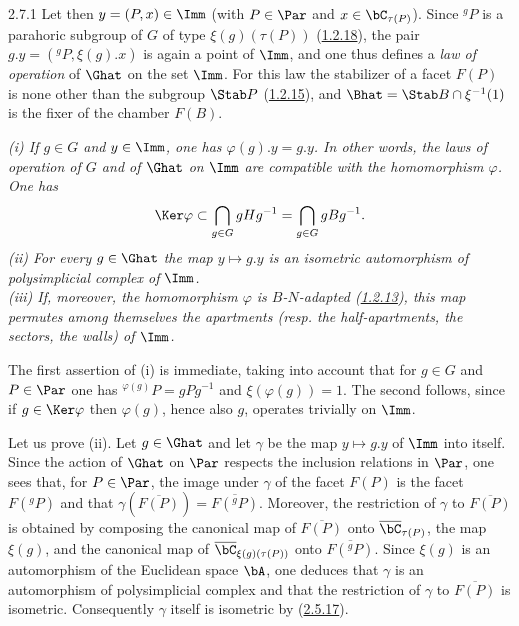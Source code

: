 \documentclass[12pt,a4paper,oneside,english]{smfart}
\makeatletter
\newcommand{\btanchor}[1]{\leavevmode\Hy@raisedlink{\hypertarget{bt:#1}{}}}
\newcommand{\btpageanchor}[1]{\Hy@raisedlink{\hypertarget{p:#1}{}}}
\newcommand{\btref}[1]{\hyperlink{bt:#1}{#1}}
\newcommand{\btpage}[1]{\marginnote{p.~#1}\btpageanchor{#1}}
\newcommand{\pagemark}[1]{\btpage{#1}}
\theoremstyle{definition}
\theoremstyle{bt}
\makeatother
\begin{document}
\num{2.7.1}\btanchor{2.7.1}
Let then $y=(P,x)\in\Imm$ (with $P\in\Par$ and $x\in\bC_{\tau(P)}$). Since
${}^{g}P$ is a parahoric subgroup of $G$ of type $\xi(g)(\tau(P))$ (\btref{1.2.18}),
the pair $g.y=({}^{g}P,\xi(g).x)$ is again a point of $\Imm$, and one thus
defines a \emph{law of operation} of $\Ghat$ on the set $\Imm$. For this law
the stabilizer of a facet $F(P)$ is none other than the subgroup $\Stab P$
(\btref{1.2.15}), and $\Bhat=\Stab B\cap\xi^{-1}(1)$ is the fixer of the chamber
$F(B)$.

\btanchor{2.7.2}
\emph{(i) If $g\in G$ and $y\in\Imm$, one has $\varphi(g).y=g.y$. In other
words, the laws of operation of $G$ and of $\Ghat$ on $\Imm$ are compatible
with the homomorphism $\varphi$. One has
\[
\Ker\varphi\subset\bigcap_{g\in G} gHg^{-1}=\bigcap_{g\in G} gBg^{-1}.
\]
(ii) For every $g\in\Ghat$ the map $y\mapsto g.y$ is an isometric automorphism
of polysimplicial complex of $\Imm$.\\
(iii) If, moreover, the homomorphism $\varphi$ is $B$-$N$-adapted (\btref{1.2.13}),
this map permutes among themselves the apartments (resp. the half-apartments,
the sectors, the walls) of $\Imm$.}

\medskip
The first assertion of (i) is immediate, taking into account that for $g\in G$
and $P\in\Par$ one has ${}^{\varphi(g)}P=gPg^{-1}$ and $\xi(\varphi(g))=1$.
The second follows, since if $g\in\Ker\varphi$ then $\varphi(g)$, hence also
$g$, operates trivially on $\Imm$.

Let us prove (ii). Let $g\in\Ghat$ and let $\gamma$ be the map $y\mapsto g.y$
of $\Imm$ into itself. Since the action of $\Ghat$ on $\Par$ respects the
inclusion relations in $\Par$, one sees that, for $P\in\Par$, the image under
$\gamma$ of the facet $F(P)$ is the facet $F({}^{g}P)$ and that
$\gamma(\overline{F(P)})=\overline{F({}^{g}P)}$. Moreover, the restriction of
$\gamma$ to $\overline{F(P)}$ is obtained by composing the canonical map of
$\overline{F(P)}$ onto $\overline{\bC}_{\tau(P)}$, the map $\xi(g)$, and the
canonical map of $\overline{\bC}_{\xi(g)(\tau(P))}$ onto
$\overline{F({}^{g}P)}$. Since $\xi(g)$ is an automorphism of the Euclidean
space $\bA$, one deduces that $\gamma$ is an automorphism
\pagemark{50}
of polysimplicial complex and that the restriction of $\gamma$ to
$\overline{F(P)}$ is isometric. Consequently $\gamma$ itself is isometric by
(\btref{2.5.17}).
\end{document}
